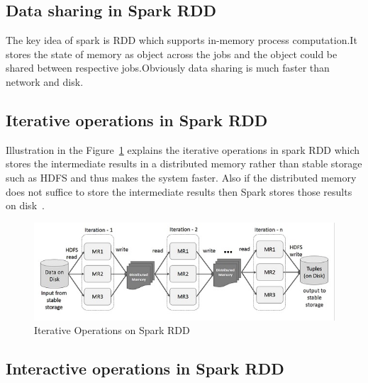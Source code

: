 \subsection{Data sharing in Spark RDD}
The key idea of spark is RDD which supports in-memory process computation.It 
stores the state of memory as object across the jobs and the object could be 
shared between respective jobs.Obviously data sharing is much faster than 
network and disk.


\subsection{Iterative operations in Spark RDD}

Illustration in the Figure~\ref{fig:iterative-spark} explains the iterative 
operations in spark RDD which stores the intermediate results in a distributed 
memory rather than stable storage such as HDFS and thus makes the system faster.
Also if the distributed memory does not suffice to store the intermediate 
results then Spark stores those results on disk~\cite{hid-sp18-410-spark-RDD}.




\begin{figure}[!ht]
  \centering\includegraphics[width=\columnwidth]{images/iterativeSpark.png}
   \caption{Iterative Operations on Spark RDD
   ~\cite{hid-sp18-410-spark-RDD}}\label{fig:iterative-spark}
\end{figure}



\subsection{Interactive operations in Spark RDD}

